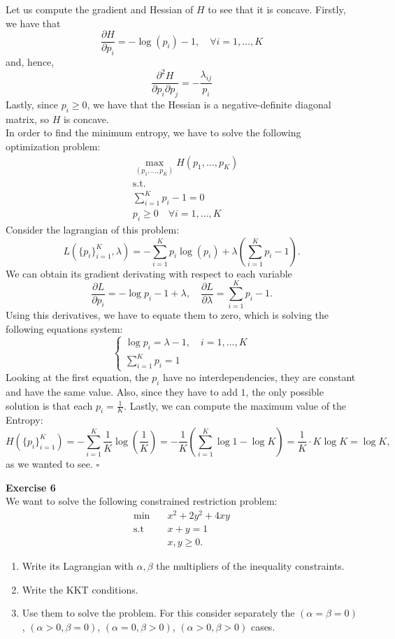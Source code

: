 \documentclass[11pt,table]{article}
\newcommand{\qed}{\hfill $\square$}
\newenvironment{problem}[2][Exercise]
    { \begin{mdframed}[backgroundcolor=gray!20] \textbf{#1 #2} \\}
    {  \end{mdframed}}
\begin{document}
Let us compute the gradient and Hessian of \(H\) to see that it is concave. Firstly, we have that
\[
\frac{\partial H}{\partial p_i} = - \log(p_i) - 1, \quad \forall i = 1,\dots,K
\]
and, hence,
\[
\frac{\partial^2 H}{\partial p_i \partial p_j} = - \frac{\lambda_{ij}}{p_i}  
\]
Lastly, since \(p_i \geq 0\), we have that the Hessian is a negative-definite diagonal matrix, so \(H\) is concave.\\

In order to find the minimum entropy, we have to solve the following optimization problem:
\begin{align*}
&\max_{(p_1,\dots,p_K)} H(p_1,\dots,p_K)\\
&\text{s.t.}\\
&\sum_{i=1}^K p_i -1 = 0\\
&p_i \geq 0 \quad \forall i =1,\dots,K 
\end{align*}
Consider the lagrangian of this problem:
\[
L\left(\{p_i\}_{i=1}^K, \lambda\right) = - \sum_{i=1}^K p_i \log(p_i) + \lambda\left(\sum_{i=1}^K p_i -1\right).   
\]
We can obtain its gradient derivating with respect to each variable
\[
\frac{\partial L}{\partial p_i} = - \log p_i - 1 + \lambda, \quad \frac{\partial L}{\partial \lambda} =  \sum_{i=1}^K p_i -1.
\]
Using this derivatives, we have to equate them to zero, which is solving the following equations system:
\[
\begin{cases}
  \log p_i = \lambda - 1, \quad i = 1,\dots,K \\
  \sum_{i=1}^K p_i = 1
\end{cases}  
\]
Looking at the first equation, the \(p_i\) have no interdependencies, they are constant and have the same value. Also, since they have to add \(1\), the only possible solution is that each \(p_i = \frac{1}{K}\). Lastly, we can compute the maximum value of the Entropy:
\[
H\left(\{p_i\}_{i=1}^K\right) = - \sum_{i=1}^K \frac{1}{K} \log \left(\frac{1}{K}\right)  = - \frac{1}{K} \left(\sum_{i=1}^K \log 1 - \log K\right) = \frac{1}{K} \cdot K \log K = \log K, 
\]
as we wanted to see. \qed

\begin{problem}{6}
  We want to solve the following constrained restriction problem:
  \begin{align*}
    \min \quad &  x^{2} + 2y^{2} + 4xy \\
    \text{s.t} \quad &  x + y = 1 \\
    & x,y \geq 0.
  \end{align*}
  \begin{enumerate}
    \item Write its Lagrangian with \(\alpha,\beta\) the multipliers of the inequality constraints.
    \item Write the KKT conditions.
          \item Use them to solve the problem. For this consider separately the \((\alpha = \beta = 0)\), \((\alpha > 0, \beta = 0)\), \((\alpha = 0, \beta > 0)\), \((\alpha > 0, \beta > 0)\) cases.
\end{enumerate}
\end{problem}
\end{document}
